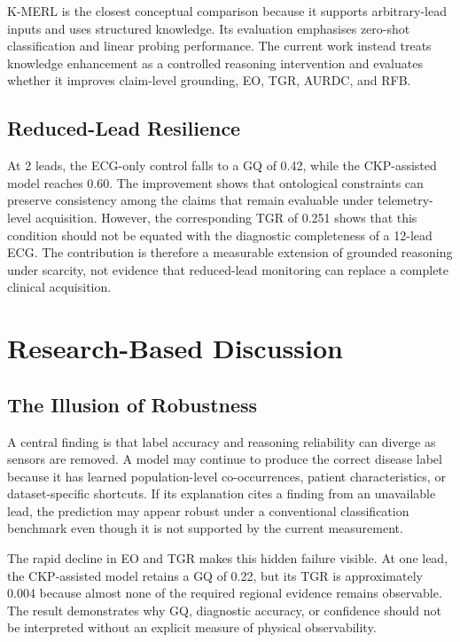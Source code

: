 \documentclass{ssnreview}
\begin{document}
K-MERL is the closest conceptual comparison because it supports arbitrary-lead inputs and
uses structured knowledge. Its evaluation emphasises zero-shot classification and linear
probing performance. The current work instead treats knowledge enhancement as a controlled
reasoning intervention and evaluates whether it improves claim-level grounding, EO,
TGR, AURDC, and RFB.

\subsection{Reduced-Lead Resilience}

At 2 leads, the ECG-only control falls to a GQ of 0.42, while the CKP-assisted model
reaches 0.60. The improvement shows that ontological constraints can preserve consistency
among the claims that remain evaluable under telemetry-level acquisition. However, the
corresponding TGR of 0.251 shows that this condition should not be equated with the
diagnostic completeness of a 12-lead ECG. The contribution is therefore a measurable
extension of grounded reasoning under scarcity, not evidence that reduced-lead monitoring
can replace a complete clinical acquisition.

\section{Research-Based Discussion}

\subsection{The Illusion of Robustness}

A central finding is that label accuracy and reasoning reliability can diverge as sensors are
removed. A model may continue to produce the correct disease label because it has learned
population-level co-occurrences, patient characteristics, or dataset-specific shortcuts.
If its explanation cites a finding from an unavailable lead, the prediction may appear
robust under a conventional classification benchmark even though it is not supported by
the current measurement.

The rapid decline in EO and TGR makes this hidden failure visible. At one lead, the
CKP-assisted model retains a GQ of 0.22, but its TGR is approximately 0.004 because
almost none of the required regional evidence remains observable. The result demonstrates
why GQ, diagnostic accuracy, or confidence should not be interpreted without an explicit
measure of physical observability.
\end{document}
